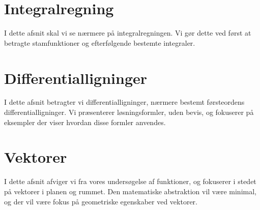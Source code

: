 











\chapter{Integralregning}
I dette afsnit skal vi se nærmere på integralregningen. Vi gør dette ved først at betragte stamfunktioner og efterfølgende bestemte integraler. 















\chapter{Differentialligninger}
I dette afsnit betragter vi differentialligninger, nærmere bestemt førsteordens differentialligninger. Vi præsenterer løsningsformler, uden bevis, og fokuserer på eksempler der viser hvordan disse formler anvendes.












\chapter{Vektorer}
I dette afsnit afviger vi fra vores undersøgelse af funktioner, og fokuserer i stedet på vektorer i planen og rummet. Den matematiske abstraktion vil være minimal, og der vil være fokus på geometriske egenskaber ved vektorer. 






